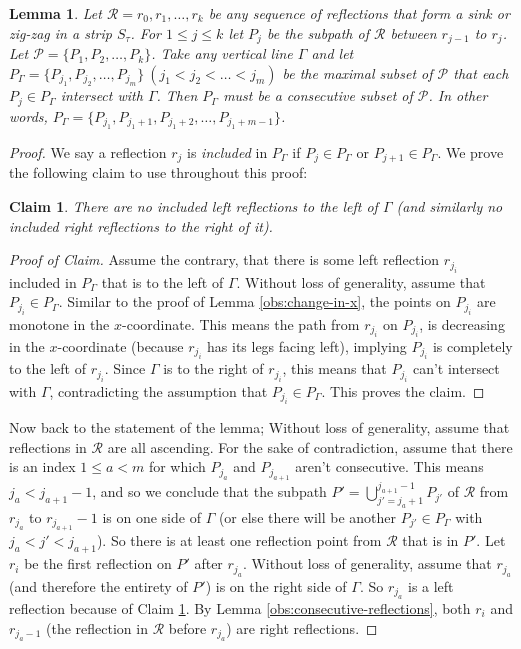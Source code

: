 \documentclass[pdflatex,sn-mathphys-num]{sn-jnl}
\theoremstyle{thmstyleone}
\newtheorem{lemma}{Lemma}
\newtheorem{claim}{Claim} %
\begin{document}
\begin{lemma}\label{lemma:consecutive-reflection-shadow}
    Let $\mathcal R = r_0, r_1,\dots, r_k$ be any sequence of reflections that form a sink or zig-zag in a strip $S_\tau$. For $1\le j \le k$ let $P_j$ be the subpath of $\mathcal R$ between $r_{j - 1}$ to $r_{j}$. Let $ \mathcal P = \{P_1, P_2,\dots, P_k\} $. Take any vertical line $\Gamma$ and let $P_\Gamma = \{P_{j_1}, P_{j_2},\dots, P_{j_m}\}\ (j_1< j_2< \dots < j_m)$ be the maximal subset of $\mathcal P$ that each $ P_j\in P_\Gamma $ intersect with $\Gamma$. Then $P_\Gamma$ must be a consecutive subset of $\mathcal P$. In other words, $P_\Gamma = \{P_{j_1}, P_{j_1 + 1}, P_{j_1 + 2},\dots, P_{j_1 + m - 1}\}$.
\end{lemma}
\begin{proof} 
    We say a reflection $r_j$ is {\em included} in $P_\Gamma$ if $P_j\in P_\Gamma$ or $P_{j + 1}\in P_\Gamma$. 
    We prove the following claim to use throughout this proof:
    \begin{claim}\label{claim:included-reflections}
    	There are no included left reflections to the left of $\Gamma$ (and similarly no included right reflections to the right of it). 
    \end{claim}
    \begin{proof}[Proof of Claim]
    	Assume the contrary, that there is some left reflection $r_{j_i}$ included in $P_\Gamma$ that is to the left of $\Gamma$. Without loss of generality, assume that $P_{j_i}\in P_\Gamma$. Similar to the proof of Lemma \ref{obs:change-in-x}, the points on $P_{j_i}$ are monotone in the $x$-coordinate. This means the path from $r_{j_i}$ on $P_{j_i}$, is decreasing in the $x$-coordinate (because $r_{j_i}$ has its legs facing left), implying $P_{j_i}$ is completely to the left of $r_{j_i}$. Since $\Gamma$ is to the right of $r_{j_i}$, this means that $P_{j_i}$ can't intersect with $\Gamma$, contradicting the assumption that $P_{j_i}\in P_\Gamma$. This proves the claim.
	\end{proof}
	
    Now back to the statement of the lemma;
    Without loss of generality, assume that reflections in $\mathcal R$ are all ascending. 
    For the sake of contradiction, assume that there is an index $1\le a < m$ for which $P_{j_a}$ and $P_{j_{a+1}}$ aren't consecutive. This means $j_a < j_{a + 1} - 1$, and so we conclude that the subpath $P' = \bigcup_{j' = j_a + 1}^{j_{a + 1} - 1}P_{j'}$ of $\mathcal R$ from $r_{j_a}$ to $r_{j_{a+1}} - 1$
    is on one side of $\Gamma$ (or else there will be another $P_{j'}\in P_\Gamma$ with $j_a < j' < j_{a+1}$). So there is at least one reflection point from $\mathcal R$ that is in $P'$. Let $r_{i}$ be the first reflection on $P'$ after $r_{j_a}$.
    Without loss of generality, assume that $r_{j_a}$ (and therefore the entirety of $P'$) is on the right side of $\Gamma$. So $r_{j_a}$ is a left reflection because of Claim \ref{claim:included-reflections}. 
    By Lemma \ref{obs:consecutive-reflections}, both $r_{i}$ and $r_{j_a - 1}$ (the reflection in $\mathcal R$ before $r_{j_a}$) are right reflections. 
    

\end{proof}
\end{document}
